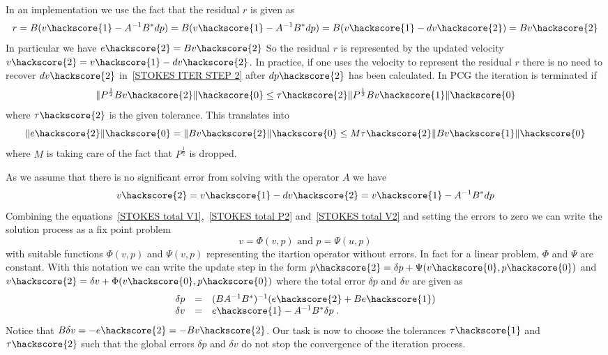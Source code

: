 In an implementation we use the fact that the residual $r$ is given as
\begin{equation} \label{STOKES RES }
 r= B (v\hackscore{1} -  A^{-1} B^{*} dp) =  B (v\hackscore{1} - A^{-1} B^{*} dp) = B (v\hackscore{1}-dv\hackscore{2}) = B v\hackscore{2}
\end{equation}
In particular we have $e\hackscore{2} = B v\hackscore{2}$
So the residual $r$ is represented by the updated velocity $v\hackscore{2}=v\hackscore{1}-dv\hackscore{2}$. In practice, if
one uses the velocity to represent the residual $r$ there is no need 
to recover $dv\hackscore{2}$ in~\ref{STOKES ITER STEP 2} after $dp\hackscore{2}$ has been calculated.
In PCG the iteration is terminated if
\begin{equation} \label{STOKES P OPERATOR ERROR}
\| P^{\frac{1}{2}}B v\hackscore{2} \|\hackscore{0} \le \tau\hackscore{2} \| P^{\frac{1}{2}}B v\hackscore{1} \|\hackscore{0}
\end{equation}
where $\tau\hackscore{2}$ is the given tolerance. This translates into
\begin{equation} \label{STOKES P OPERATOR ERROR 2}
\|e\hackscore{2}\|\hackscore{0} = \| B v\hackscore{2} \|\hackscore{0} \le M \tau\hackscore{2} \| B v\hackscore{1} \|\hackscore{0}
\end{equation}
where $M$ is taking care of the fact that $P^{\frac{1}{2}}$ is dropped.   

As we assume that there is no significant error from solving with the operator $A$ we have 
\begin{equation} \label{STOKES total V2}
v\hackscore{2} =  v\hackscore{1} - dv\hackscore{2} 
= v\hackscore{1}  - A^{-1} B^{*}dp 
\end{equation}
Combining the equations~\ref{STOKES total V1},~\ref{STOKES total P2} and~\ref{STOKES total V2} and
setting the errors to zero we can write the solution process as a fix point problem 
\begin{equation} 
v = \Phi(v,p) \mbox{ and } p = \Psi(u,p) 
\end{equation}
with suitable functions $\Phi(v,p)$ and $ \Psi(v,p)$ representing the itartion operator without 
errors. In fact for a linear problem,  $\Phi$ and $\Psi$ are constant. With this notation we can write
the update step in the form $p\hackscore{2}= \delta p + \Psi(v\hackscore{0},p\hackscore{0})$ and 
$v\hackscore{2}= \delta v + \Phi(v\hackscore{0},p\hackscore{0})$ where 
the total error $\delta p$ and $\delta v$ are given as
\begin{equation} 
 \begin{array}{rcl}
\delta p & = &  (B A^{-1} B^{*})^{-1} ( e\hackscore{2} + B e\hackscore{1} ) \\
\delta v & = &  e\hackscore{1} -  A^{-1} B^{*}\delta p  \;.
\end{array}\label{STOKES ERRORS}
\end{equation}
Notice that $B\delta v = - e\hackscore{2}=-Bv\hackscore{2}$. Our task is now to choose the tolerances
$\tau\hackscore{1}$ and $\tau\hackscore{2}$ such that the global errors $\delta p$ and $\delta v$
do not stop the convergence of the iteration process. 

